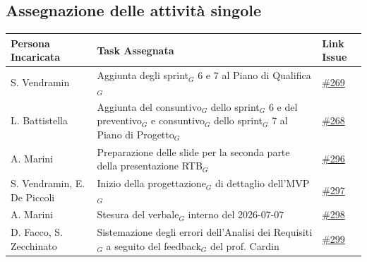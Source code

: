\documentclass[a4paper, 10pt, colorlinks=true, linkcolor=black, urlcolor=blue, citecolor=blue, hidelinks]{article}
\newcommand{\issue}[1]{\href{https://github.com/thebitless-group-swe/thebitless.github.io/issues/#1}{\##1}}
\begin{document}
\subsection{Assegnazione delle attività singole}
\begin{center}
    \renewcommand{\arraystretch}{1.4}
        \begin{tabular}{|p{4.2cm}|p{6.2cm}|p{2.2cm}|}
        \hline
        \textbf{Persona Incaricata} & \textbf{Task Assegnata} & \centering\textbf{Link Issue} \tabularnewline
        \hline
        S. Vendramin & Aggiunta degli sprint$_G$ 6 e 7 al Piano di Qualifica$_G$ & \issue{269} \\
        \hline
        L. Battistella & Aggiunta del consuntivo$_G$ dello sprint$_G$ 6 e del preventivo$_G$ e consuntivo$_G$ dello sprint$_G$ 7 al Piano di Progetto$_G$ & \issue{268} \\
        \hline
        A. Marini & Preparazione delle slide per la seconda parte della presentazione RTB$_G$ & \issue{296} \\
        \hline
        S. Vendramin, E. De Piccoli & Inizio della progettazione$_G$ di dettaglio dell'MVP$_G$ & \issue{297} \\
        \hline
        A. Marini & Stesura del verbale$_G$ interno del 2026-07-07 & \issue{298} \\
        \hline
        D. Facco, S. Zecchinato & Sistemazione degli errori dell'Analisi dei Requisiti$_G$ a seguito del feedback$_G$ del prof. Cardin & \issue{299} \\
        \hline
    \end{tabular}
\end{center}

\appendix
\end{document}
